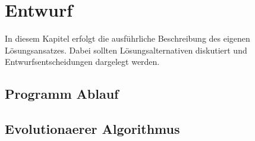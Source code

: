 
\chapter{Entwurf}
\label{ch:Entwurf}
In diesem Kapitel erfolgt die ausf{\"u}hrliche Beschreibung des eigenen
L{\"o}sungsansatzes. Dabei sollten L{\"o}sungsalternativen diskutiert und
Entwurfsentscheidungen dargelegt werden.


\section{Programm Ablauf}
\label{ch:Entwurf:sec:Programm Ablauf}




\section{Evolutionaerer Algorithmus}
\label{ch:Entwurf:sec:Evolutionaerer Algorithmus}









